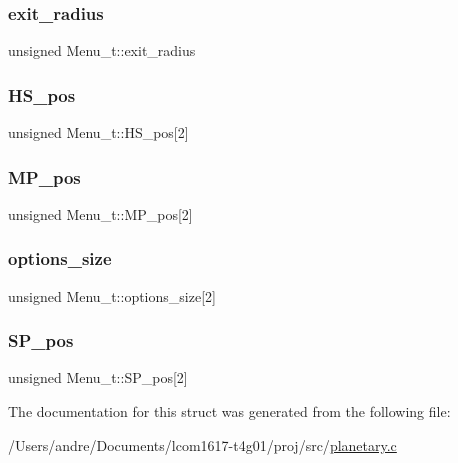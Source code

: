 \subsubsection{\texorpdfstring{exit\+\_\+radius}{exit\_radius}}
{\footnotesize\ttfamily unsigned Menu\+\_\+t\+::exit\+\_\+radius}

\hypertarget{struct_menu__t_ae3ed027861d6123a178a82a6f60fdb74}{}\label{struct_menu__t_ae3ed027861d6123a178a82a6f60fdb74} 
\subsubsection{\texorpdfstring{H\+S\+\_\+pos}{HS\_pos}}
{\footnotesize\ttfamily unsigned Menu\+\_\+t\+::\+H\+S\+\_\+pos\mbox{[}2\mbox{]}}

\hypertarget{struct_menu__t_a252b5ddb2d7e97a790ef0a5d95af6078}{}\label{struct_menu__t_a252b5ddb2d7e97a790ef0a5d95af6078} 
\subsubsection{\texorpdfstring{M\+P\+\_\+pos}{MP\_pos}}
{\footnotesize\ttfamily unsigned Menu\+\_\+t\+::\+M\+P\+\_\+pos\mbox{[}2\mbox{]}}

\hypertarget{struct_menu__t_a7d1e90a9edc6dacce833bb39ab75e1e3}{}\label{struct_menu__t_a7d1e90a9edc6dacce833bb39ab75e1e3} 
\subsubsection{\texorpdfstring{options\+\_\+size}{options\_size}}
{\footnotesize\ttfamily unsigned Menu\+\_\+t\+::options\+\_\+size\mbox{[}2\mbox{]}}

\hypertarget{struct_menu__t_a73413f3fc2848f75e731c17a4ba51f74}{}\label{struct_menu__t_a73413f3fc2848f75e731c17a4ba51f74} 
\subsubsection{\texorpdfstring{S\+P\+\_\+pos}{SP\_pos}}
{\footnotesize\ttfamily unsigned Menu\+\_\+t\+::\+S\+P\+\_\+pos\mbox{[}2\mbox{]}}



The documentation for this struct was generated from the following file\+:\begin{DoxyCompactItemize}
\item 
/\+Users/andre/\+Documents/lcom1617-\/t4g01/proj/src/\hyperlink{planetary_8c}{planetary.\+c}\end{DoxyCompactItemize}
